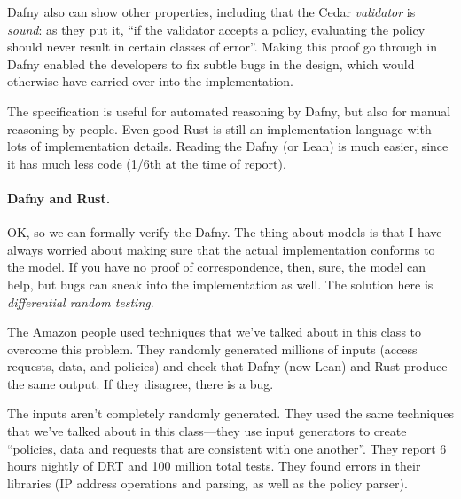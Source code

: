 \documentclass[11pt]{article}
\begin{document}
Dafny also can show other properties, including that the Cedar \emph{validator} is \emph{sound}: as they put it,
``if the validator accepts a policy, evaluating the policy should never result in certain classes of error''.
Making this proof go through in Dafny enabled the developers to fix subtle bugs in the design, which would otherwise
have carried over into the implementation.

The specification is useful for automated reasoning by Dafny, but also for manual reasoning
by people. Even good Rust is still an implementation language with lots of implementation details.
Reading the Dafny (or Lean) is much easier, since it has much less code (1/6th at the time of report).

\paragraph{Dafny and Rust.} OK, so we can formally verify the Dafny. The thing about models is that
I have always worried about making sure that the actual implementation conforms to the model. If you have
no proof of correspondence, then, sure, the model can help, but bugs can sneak into the implementation as well.
The solution here is \emph{differential random testing}.

The Amazon people used techniques that we've talked about in this class to overcome this problem.
They randomly generated millions of inputs (access requests, data, and policies) and check that Dafny (now Lean)
and Rust produce the same output. If they disagree, there is a bug.

The inputs aren't completely randomly generated. They used the same techniques that we've talked about in
this class---they use input generators to create ``policies, data and requests that are consistent with one another''.
They report 6 hours nightly of DRT and 100 million total tests. They found errors in their libraries
(IP address operations and parsing, as well as the policy parser).




\end{document}
